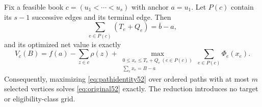 \begin{theorem}\label{thm:path52}
Fix a feasible book $c=(u_1<\cdots<u_s)$ with anchor $a=u_1$. Let $P(c)$ contain its $s-1$ successive edges and its terminal edge. Then
\begin{equation}\label{eq:capacityidentity52}
 \sum_{e\in P(c)}(T_e+Q_e)=\bar b-a,
\end{equation}
and its optimized net value is exactly
\begin{equation}\label{eq:pathidentity52}
 V_c(B)=f(a)-\sum_{z\in c}\rho(z)+
 \max_{\substack{0\leq x_e\leq T_e+Q_e\ (e\in P(c))\\\sum_e x_e=B-a}}\sum_{e\in P(c)}\Phi_e(x_e).
\end{equation}
Consequently, maximizing \eqref{eq:pathidentity52} over ordered paths with at most $m$ selected vertices solves \eqref{eq:original52} exactly. The reduction introduces no target or eligibility-class grid.
\end{theorem}
